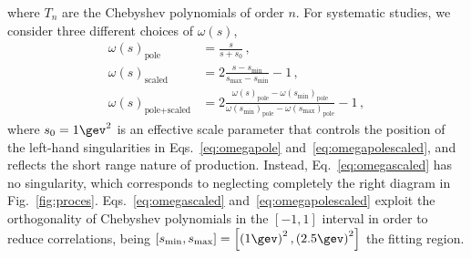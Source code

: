 where $T_n$ are the Chebyshev polynomials of order $n$. For systematic studies, we consider three different choices of   $\omega(s)$,
\begin{subequations}
\begin{align}
\omega(s)_\text{pole}&=\frac{s}{s+s_0}\,, \label{eq:omegapole} \\
\omega(s)_\text{scaled}&=2\frac{s-s_\text{min}}{s_\text{max}-s_\text{min}}-1\,, \label{eq:omegascaled}\\
\omega(s)_\text{pole+scaled} &=2\frac{\omega(s)_\text{pole}-\omega(s_\text{min})_\text{pole}}{\omega(s_\text{min})_\text{pole}-\omega(s_\text{max})_\text{pole}}-1\,, \label{eq:omegapolescaled}
\end{align}
\end{subequations}
where $s_0 = 1\gev^2$ is an effective scale parameter that controls the position of the left-hand singularities in Eqs.~\eqref{eq:omegapole} and~\eqref{eq:omegapolescaled}, and reflects the short range nature of production. Instead, Eq.~\eqref{eq:omegascaled} has no singularity, which corresponds to neglecting completely the right diagram in Fig.~\ref{fig:proces}. 
Eqs.~\eqref{eq:omegascaled} and~\eqref{eq:omegapolescaled} exploit the orthogonality of Chebyshev polynomials in the $[-1,1]$ interval in order to reduce correlations, being $\left[s_\text{min},s_\text{max}\right] = \left[\left(1\gev\right)^2,\left(2.5\gev\right)^2\right]$ the fitting region.  

